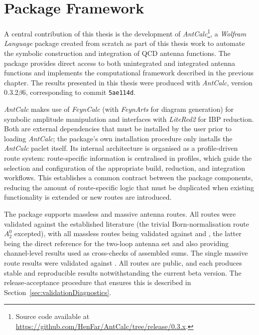 \chapter{Package Framework}\label{ch:packageframework}

A central contribution of this thesis is the development of
\textit{AntCalc}\footnote{Source code available at
\url{https://github.com/HenFar/AntCalc/tree/release/0.3.x}.}, a \textit{Wolfram Language}
package created from scratch as part of this thesis work to automate the symbolic
construction and integration of QCD antenna functions. The package provides direct access to
both unintegrated and integrated antenna functions and implements the computational framework
described in the previous chapter. The results presented in this thesis were produced with
\textit{AntCalc}, version 0.3.2$\beta$6, corresponding to commit \texttt{5ae114d}.

\textit{AntCalc} makes use of \textit{FeynCalc} \cite{Feyncalc1,Feyncalc2,Feyncalc3,Feyncalc4}
(with \textit{FeynArts} \cite{Hahn:2000kx} for diagram generation) for symbolic amplitude manipulation and interfaces with \textit{LiteRed2} \cite{Litered,Lee:2013mka} for
IBP reduction. Both are external dependencies that must be installed by the user prior to
loading \textit{AntCalc}; the package's own installation procedure only installs the
\textit{AntCalc} paclet itself.
Its internal architecture is organised as a
profile-driven route system: route-specific information is centralised in
profiles, which guide the selection and configuration of the appropriate build,
reduction, and integration workflows. This establishes a common contract
between the package components, reducing the amount of route-specific logic
that must be duplicated when existing functionality is extended or new routes
are introduced.

The package supports massless and massive antenna routes. All routes were validated against
the established literature (the trivial Born-normalisation route $A_2^0$ excepted), with all massless routes being validated against
\cite{Gehrmann-DeRidder:2005btv} and \cite{Gehrmann-DeRidder:2004ttg}, the latter being the direct
reference for the two-loop antenna set and also providing channel-level results used as
cross-checks of assembled sums. The single massive route results were validated
against \cite{GehrmannDeRidder:2009fz}. All routes are public, and each produces stable and reproducible results notwithstanding the current beta version. The release-acceptance procedure 
that ensures this is described in Section~\ref{sec:validationDiagnostics}.

